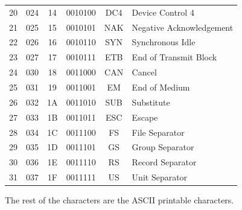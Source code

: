 \documentclass{article}
\begin{document}
\begin{center}
{\begin{tabular}{ |c|c|c|c|c|l| }
  20 & 024 & 14 & 0010100 & DC4 & Device Control 4 \\
  21 & 025 & 15 & 0010101 & NAK & Negative Acknowledgement\\
  22 & 026 & 16 & 0010110 & SYN & Synchronous Idle \\
  23 & 027 & 17 & 0010111 & ETB & End of Transmit Block\\
  24 & 030 & 18 & 0011000 & CAN & Cancel\\
  25 & 031 & 19 & 0011001 & EM & End of Medium\\
  26 & 032 & 1A & 0011010 & SUB & Substitute\\
  27 & 033 & 1B & 0011011 & ESC & Escape\\
  28 & 034 & 1C & 0011100 & FS & File Separator \\
  29 & 035 & 1D & 0011101 & GS & Group Separator\\
  30 & 036 & 1E & 0011110 & RS & Record Separator \\
  31 & 037 & 1F & 0011111 & US & Unit Separator\\
  \hline
  \end{tabular}}
  \end{center}

  The rest of the characters are the ASCII printable characters. 
\end{document}

